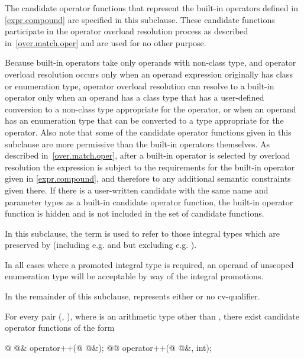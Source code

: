 \pnum
The candidate operator functions that represent the built-in operators
defined in \ref{expr.compound} are specified in this subclause.
These candidate
functions participate in the operator overload resolution process as
described in~\ref{over.match.oper} and are used for no other purpose.
\begin{note}
Because built-in operators take only operands with non-class type,
and operator overload resolution occurs only when an operand expression
originally has class or enumeration type,
operator overload resolution can resolve to a built-in operator only
when an operand has a class type that has a user-defined conversion to
a non-class type appropriate for the operator, or when an operand has
an enumeration type that can be converted to a type appropriate
for the operator.
Also note that some of the candidate operator functions given in this subclause are
more permissive than the built-in operators themselves.
As
described in~\ref{over.match.oper}, after a built-in operator is selected
by overload resolution the expression is subject to the requirements for
the built-in operator given in \ref{expr.compound}, and therefore to any
additional semantic constraints given there.
If there is a user-written
candidate with the same name and parameter types as a built-in
candidate operator function, the built-in operator function
is hidden and is not included in the set of candidate functions.
\end{note}

\pnum
{}%
%
In this subclause, the term
is used to refer to those integral types which are preserved by
 (including e.g.
and
but excluding e.g.
).
\begin{note}
In all cases where a promoted integral type is
required, an operand of unscoped enumeration type will be acceptable by way of the
integral promotions.
\end{note}

\pnum
In the remainder of this subclause,  represents either
 or no cv-qualifier.

\pnum
For every pair
(,
),
where
is an arithmetic type other than ,
there exist candidate operator functions of the form
\begin{codeblock}
@ @& operator++(@ @&);
@@ operator++(@ @&, int);
\end{codeblock}

